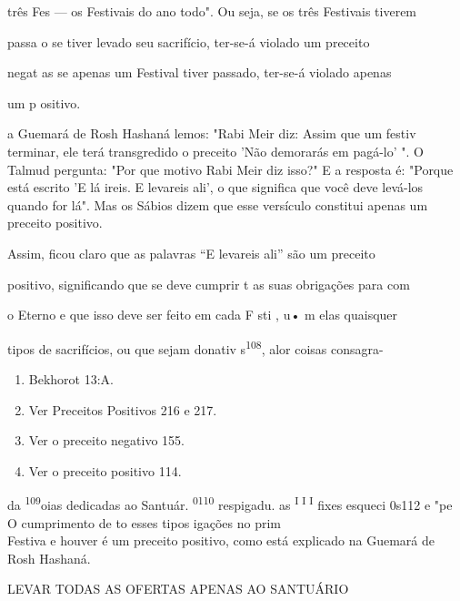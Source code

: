 três Fes --- os Festivais do ano todo". Ou seja, se os três Festivais
tiverem

passa o se tiver levado seu sacrifício, ter-se-á violado um preceito

negat as se apenas um Festival tiver passado, ter-se-á violado apenas

um p ositivo.

a Guemará de Rosh Hashaná lemos: "Rabi Meir diz: Assim que um festiv
terminar, ele terá transgredido o preceito 'Não demorarás em pagá-lo' ".
O Talmud pergunta: "Por que motivo Rabi Meir diz isso?" E a resposta é:
"Por­que está escrito 'E lá ireis. E levareis ali', o que significa que
você deve levá-los quando for lá". Mas os Sábios dizem que esse
versículo constitui apenas um preceito positivo.


Assim, ficou claro que as palavras ``E levareis ali'' são um preceito


positivo, significando que se deve cumprir t as suas obrigações para com

o Eterno e que isso deve ser feito em cada F sti , u• m elas quaisquer

tipos de sacrifícios, ou que sejam donativ s\textsuperscript{108}, alor
coisas consagra-


\begin{enumerate}
\def\labelenumi{\arabic{enumi}.}
\setcounter{enumi}{104}
\item
 
 Bekhorot 13:A.
 
\item
 
 Ver Preceitos Positivos 216 e 217.
 
\item
 
 Ver o preceito negativo 155.
 
\item
 
 Ver o preceito positivo 114.
 
\end{enumerate}




da \textsuperscript{109}oias dedicadas ao Santuár.
\textsuperscript{0110} respigadu. as
\textsuperscript{I I I} fixes esqueci 0s112 e "pe O cumprimento de to
esses tipos igações no prim\\
Festiva e houver é um preceito positivo, como está explicado na Guemará
de Rosh Hashaná.


LEVAR TODAS AS OFERTAS APENAS AO SANTUÁRIO


